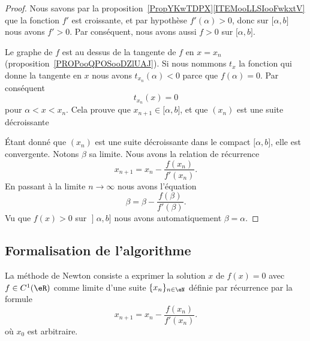 \begin{proof}
    Nous savons par la proposition~\ref{PropYKwTDPX}\ref{ITEMooLLSIooFwkxtV} que la fonction \( f'\) est croissante, et par hypothèse \( f'(\alpha)>0\), donc sur \( \mathopen[ \alpha , b \mathclose]\) nous avons \( f'>0\). Par conséquent, nous avons aussi \( f>0\) sur \( \mathopen[ \alpha , b \mathclose]\).

    Le graphe de \( f\) est au dessus de la tangente de \( f\) en \( x=x_n\) (proposition~\ref{PROPooQPOSooDZlUAJ}). Si nous nommons \( t_x\) la fonction qui donne la tangente en \( x\) nous avons \( t_{x_n}(\alpha)<0\) parce que \( f(\alpha)=0\). Par conséquent
    \begin{equation}
        t_{x_n}(x)=0
    \end{equation}
    pour \( \alpha<x<x_n\). Cela prouve que \( x_{n+1}\in\mathopen[ \alpha , b \mathclose]\), et que \( (x_n)\) est une suite décroissante

    Étant donné que \( (x_n)\) est une suite décroissante dans le compact \( \mathopen[ \alpha , b \mathclose]\), elle est convergente. Notons \( \beta\) sa limite. Nous avons la relation de récurrence
    \begin{equation}
        x_{n+1}=x_n-\frac{ f(x_n) }{ f'(x_n) }.
    \end{equation}
    En passant à la limite \( n\to \infty\) nous avons l'équation
    \begin{equation}
        \beta=\beta-\frac{ f(\beta) }{ f'(\beta) }.
    \end{equation}
    Vu que \( f(x)>0\) sur \( \mathopen] \alpha , b \mathclose]\) nous avons automatiquement \( \beta=\alpha\).
\end{proof}

\subsection{Formalisation de l'algorithme}

La méthode de Newton consiste a exprimer la solution $x$ de $f(x)=0$ avec $f\in C^1(\eR)$ comme limite d'une suite $\{x_n\}_{n\in\eN}$ définie par récurrence par la formule
\begin{equation}
	x_{n+1}=x_n-\frac{f(x_n)}{f'(x_n)}.
\end{equation}
où $x_0$ est arbitraire.

